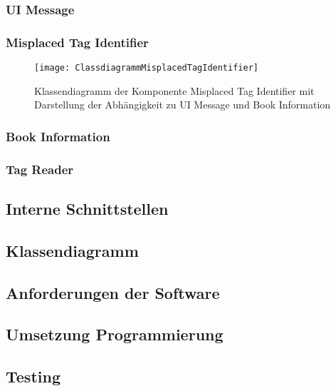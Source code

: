\subsubsection{UI Message}

\subsubsection{Misplaced Tag Identifier}
\begin{figure}[htb]
	\centering
	\texttt{[image: ClassdiagrammMisplacedTagIdentifier]}
	\caption{Klassendiagramm der Komponente Misplaced Tag Identifier mit Darstellung der Abhängigkeit zu UI Message und Book Information}
	\label{fig:ClassMisplacedTagIdentifier}
\end{figure}

\subsubsection{Book Information}
\subsubsection{Tag Reader}


\subsection{Interne Schnittstellen}

\subsection{Klassendiagramm}

\subsection{Anforderungen der Software}

\subsection{Umsetzung Programmierung}

\subsection{Testing}
